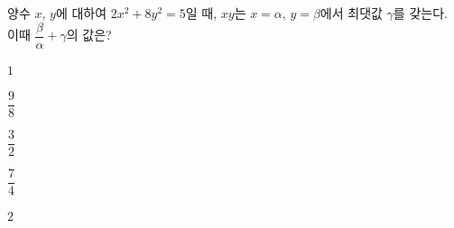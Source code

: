 양수 $x$, $y$에 대하여 $2x^2+8y^2=5$일 때, $xy$는 $x=\alpha$, $y=\beta$에서 최댓값 $\gamma$를 갖는다. 이때 $\dfrac{\beta}{\alpha}+\gamma$의 값은?
\begin{choices32}{\rule[-3ex]{0pt}{8ex}$1$}{\rule[-3ex]{0pt}{8ex}$\dfrac{9}{8}$}{\rule[-3ex]{0pt}{8ex}$\dfrac{3}{2}$}{\rule[-3ex]{0pt}{8ex}$\dfrac{7}{4}$}{\rule[-3ex]{0pt}{8ex}$2$}\end{choices32}
